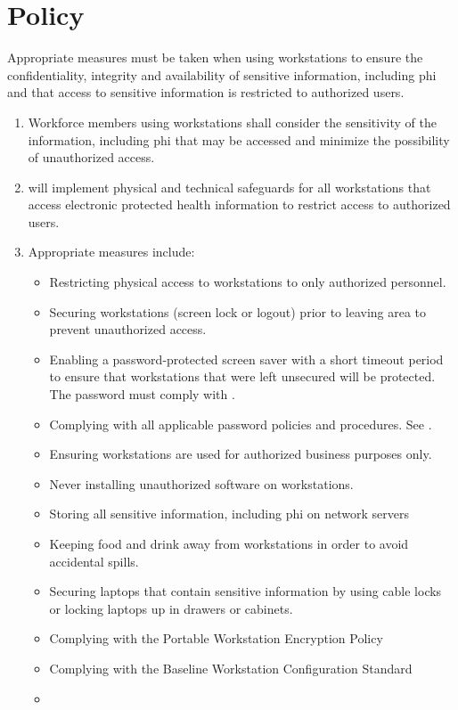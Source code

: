 \section{Policy}
Appropriate measures must be taken when using workstations to ensure the confidentiality, integrity and availability of sensitive information, including \gls{phi} and that access to sensitive information is restricted to authorized users.  
\begin{enumerate}
\item
Workforce members using workstations shall consider the sensitivity of the information, including \gls{phi} that may be accessed and minimize the possibility of unauthorized access.
\item
\CompanyName{} will implement physical and technical safeguards for all workstations that access electronic protected health information to restrict access to authorized users. 
\item
Appropriate measures include: 
\begin{itemize}
\item
Restricting physical access to workstations to only authorized personnel.
\item
Securing workstations (screen lock or logout) prior to leaving area to prevent unauthorized access.
\item
Enabling a password-protected screen saver with a short timeout period to ensure that workstations that were left unsecured will be protected.  The password must comply with \CompanyName{} \PasswordPolicies{}. 
\item
Complying with all applicable password policies and procedures. See \CompanyName{} \PasswordPolicies{}. 
\item
Ensuring workstations are used for authorized business purposes only.
\item
Never installing unauthorized software on workstations.
\item
Storing all sensitive information, including \gls{phi} on network servers  
\item
Keeping food and drink away from workstations in order to avoid accidental spills.
\item
Securing laptops that contain sensitive information by using cable locks or locking laptops up in drawers or cabinets. 
\item
Complying with the Portable Workstation Encryption Policy%
\item
Complying with the Baseline Workstation Configuration Standard%
\item

\end{itemize}
\end{enumerate}
